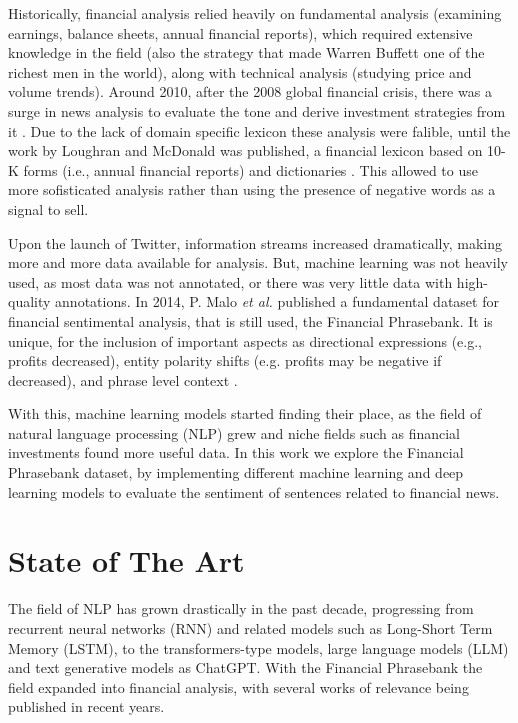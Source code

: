 \documentclass[conference]{IEEEtran}
\begin{document}
Historically, financial analysis relied heavily on fundamental analysis (examining earnings, balance sheets, annual financial reports), which required extensive knowledge in the field (also the strategy that made Warren Buffett one of the richest men in the world), along with technical analysis (studying price and volume trends). Around 2010, after the 2008 global financial crisis, there was a surge in news analysis to evaluate the tone and derive investment strategies from it \cite{tetlock2007giving}. Due to the lack of domain specific lexicon these analysis were falible, until the work by Loughran and McDonald was published, a financial lexicon based on 10-K forms (i.e., annual financial reports) and dictionaries \cite{loughran2011liability}. This allowed to use more sofisticated analysis rather than using the presence of negative words as a signal to sell.

Upon the launch of Twitter, information streams increased dramatically, making more and more data available for analysis. But, machine learning was not heavily used, as most data was not annotated, or there was very little data with high-quality annotations. In 2014, P. Malo \textit{et al.} published a fundamental dataset for financial sentimental analysis, that is still used, the Financial Phrasebank. It is unique, for the inclusion of important aspects as directional expressions (e.g., profits decreased), entity polarity shifts (e.g. profits may be negative if decreased), and phrase level context \cite{malo2014good}.

With this, machine learning models started finding their place, as the field of natural language processing (NLP) grew and niche fields such as financial investments found more useful data. In this work we explore the Financial Phrasebank dataset, by implementing different machine learning and deep learning models to evaluate the sentiment of sentences related to financial news.

\section{State of The Art}

The field of NLP has grown drastically in the past decade, progressing from recurrent neural networks (RNN) and related models such as Long-Short Term Memory (LSTM), to the transformers-type models, large language models (LLM) and text generative models as ChatGPT. With the Financial Phrasebank the field expanded into financial analysis, with several works of relevance being published in recent years.
\end{document}

